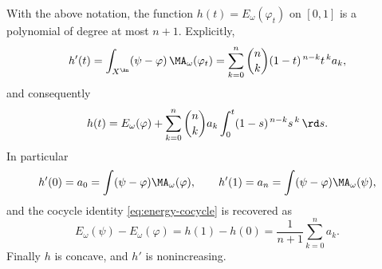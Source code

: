 \begin{proposition}
\label{prop:ch27-energy-polynomial}
With the above notation, the function
$h(t)=E_\omega(\varphi_t)$ on $[0,1]$ is a polynomial of degree at most
$n+1$.  Explicitly,
\begin{equation}\label{eq:ch27-energy-derivative-binomial}
 h'(t)=\int_{X^{\An}}(\psi-\varphi)\,\MA_\omega(\varphi_t)
 =\sum_{k=0}^n\binom nk(1-t)^{\,n-k}t^{\,k}a_k ,
\end{equation}
and consequently
\begin{equation}\label{eq:ch27-energy-integral-form}
 h(t)=E_\omega(\varphi)+\sum_{k=0}^n\binom nk a_k
      \int_0^t(1-s)^{\,n-k}s^{\,k}\,\rd s .
\end{equation}
In particular
\begin{equation}\label{eq:ch27-endpoint-derivatives}
 h'(0)=a_0=\int(\psi-\varphi)\MA_\omega(\varphi),
 \qquad
 h'(1)=a_n=\int(\psi-\varphi)\MA_\omega(\psi),
\end{equation}
and the cocycle identity \eqref{eq:energy-cocycle} is recovered as
\begin{equation}\label{eq:ch27-cocycle-recovered}
 E_\omega(\psi)-E_\omega(\varphi)=h(1)-h(0)
 =\frac1{n+1}\sum_{k=0}^na_k .
\end{equation}
Finally $h$ is concave, and $h'$ is nonincreasing.
\end{proposition}


